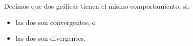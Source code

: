 \documentclass[beamer]{standalone}
\begin{document}
\begin{standaloneframe}
  Decimos que dos gráficas tienen el mismo \alert{comportamiento}, si:
  \begin{itemize}
  \item las dos son convergentes, o
  \item las dos son divergentes.
  \end{itemize}
\end{standaloneframe}
\end{document}
